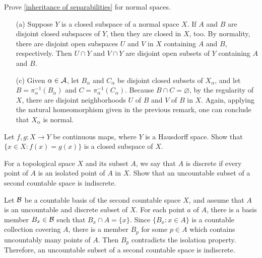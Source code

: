 \begin{prob}\label{inheritance: normal}
    Prove \cref{inheritance of separabilities} for normal spaces.
\end{prob}
\begin{sol}
    \begin{enumerate}
        \item[(a)]
        {    
            Suppose $Y$ is a closed subspace of a normal space $X$.
            If $A$ and $B$ are disjoint closed subspaces of $Y$, then they are closed in $X$, too.
            By normality, there are disjoint open subspaces $U$ and $V$ in $X$ containing $A$ and $B$, respectively.
            Then $U\cap Y$ and $V\cap Y$ are disjoint open subsets of $Y$ containing $A$ and $B$.
        }
        \item[(c)]
        {
            Given $\alpha\in{\mathcal{A}}$, let $B_\alpha$ and $C_\alpha$ be disjoint closed subsets of $X_\alpha$, and let $B=\pi_\alpha^{-1}(B_\alpha)$ and $C=\pi_\alpha^{-1}(C_\alpha)$.
            Because $B\cap C=\varnothing$, by the regularity of $X$, there are disjoint neighborhoods $U$ of $B$ and $V$ of $B$ in $X$.
            Again, applying the natural homeomorphism given in the previous remark, one can conclude that $X_\alpha$ is normal.
        }
    \end{enumerate}
\end{sol}

\color{red}
\begin{prob}
    Let $f, g: X\rightarrow Y$ be continuous maps, where $Y$ is a Hausdorff space.
    Show that $\{x\in X: f(x)=g(x)\}$ is a closed subspace of $X$.
\end{prob}
\begin{sol}
    
\end{sol}
\color{black}

\begin{prob}
    For a topological space $X$ and its subset $A$, we say that $A$ is discrete if every point of $A$ is an isolated point of $A$ in $X$.
    Show that an uncountable subset of a second countable space is indiscrete.
\end{prob}
\begin{sol}
    Let ${\mathcal{B}}$ be a countable basis of the second countable space $X$, and assume that $A$ is an uncountable and discrete subset of $X$.
    For each point $a$ of $A$, there is a basis member $B_x\in{\mathcal{B}}$ such that $B_x\cap A=\{x\}$.
    Since $\{B_x: x\in A\}$ is a countable collection covering $A$, there is a member $B_p$ for some $p\in A$ which contains uncountably many points of $A$.
    Then $B_p$ contradicts the isolation property.
    Therefore, an uncountable subset of a second countable space is indiscrete.
\end{sol}